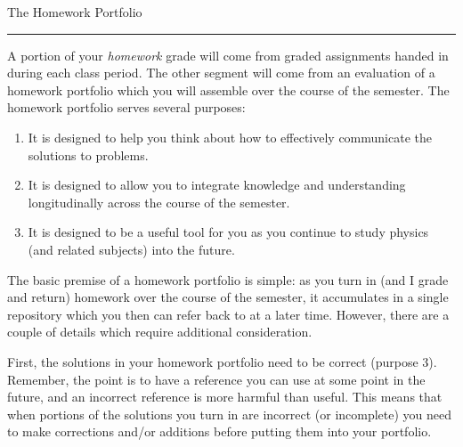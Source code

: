 \documentclass{article}
\begin{document}
\centerline{\Large The Homework Portfolio}
\vskip0.1cm\hrule\vskip0.5cm

A portion of your {\em homework} grade will come from graded
assignments handed in during each class period.  The other segment will
come from an evaluation of a homework portfolio which you will
assemble over the course of the semester.  The homework portfolio
serves several purposes:
\begin{enumerate}
\item{} It is designed to help you think about how to effectively communicate
the solutions to problems.
\item{} It is designed to allow you to integrate knowledge and understanding
longitudinally across the course of the semester.
\item{} It is designed to be a useful tool for you as you continue to study
physics (and related subjects) into the future.
\end{enumerate}
The basic premise of a homework portfolio is simple: as you turn in
(and I grade and return) homework over the course of the semester, it
accumulates in a single repository which you then can refer back to at
a later time.  However, there are a couple of details which require
additional consideration.  

First, the solutions in your homework portfolio need to be correct
(purpose 3).  Remember, the point is to have a reference you can use
at some point in the future, and an incorrect reference is more
harmful than useful.  This means that when portions of the solutions
you turn in are incorrect (or incomplete) you need to make corrections
and/or additions before putting them into your portfolio.
\end{document}
